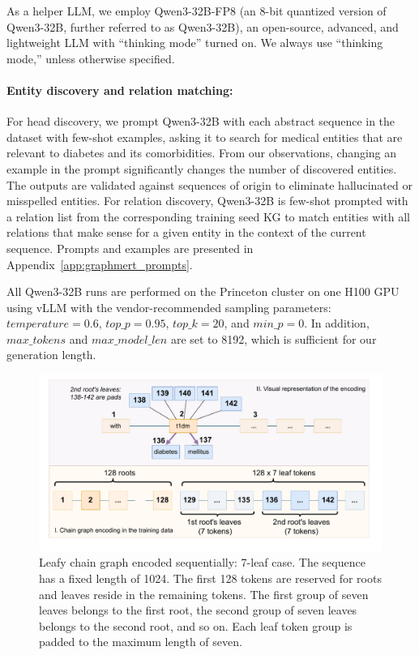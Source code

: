 \documentclass[10pt]{article}
\begin{document}
As a helper LLM, we employ Qwen3-32B-FP8 (an 8-bit quantized version of Qwen3-32B, further referred to as Qwen3-32B), an open-source, advanced, and lightweight LLM with ``thinking mode'' turned on. We always use ``thinking mode,'' unless otherwise specified.

\paragraph{Entity discovery and relation matching:} For head discovery, we prompt Qwen3-32B with each abstract sequence in the dataset with few-shot examples, asking it to search for medical entities that are relevant to diabetes and its comorbidities. From our observations, changing an example in the prompt significantly changes the number of discovered entities. The outputs are validated against sequences of origin to eliminate hallucinated or misspelled entities. For relation discovery, Qwen3-32B is few-shot prompted with a relation list from the corresponding training seed KG to match entities with all relations that make sense for a given entity in the context of the current sequence. Prompts and examples are presented in Appendix~\ref{app:graphmert_prompts}.

All Qwen3-32B runs are performed on the Princeton cluster on one H100 GPU using vLLM with the vendor-recommended sampling parameters: $temperature= 0.6$, $top\_p = 0.95$, $top\_k = 20$, and $min\_p = 0$. In addition, $max\_tokens$ and $max\_model\_len$ are set to 8192, which is sufficient for our generation length.

\begin{figure}[t!]
\centering
\includegraphics[width=0.9\linewidth]{pictures/chain_graph_encoding.pdf}
\caption{Leafy chain graph encoded sequentially: 7-leaf case. The sequence has a fixed length of 1024. The first 128 tokens are reserved for roots and leaves reside in the remaining tokens. The first group of seven leaves belongs to the first root, the second group of seven leaves belongs to the second root, and so on. Each leaf token group is padded to the maximum length of seven.}
\label{fig:chain_graph_encoding}
\end{figure}
\end{document}
